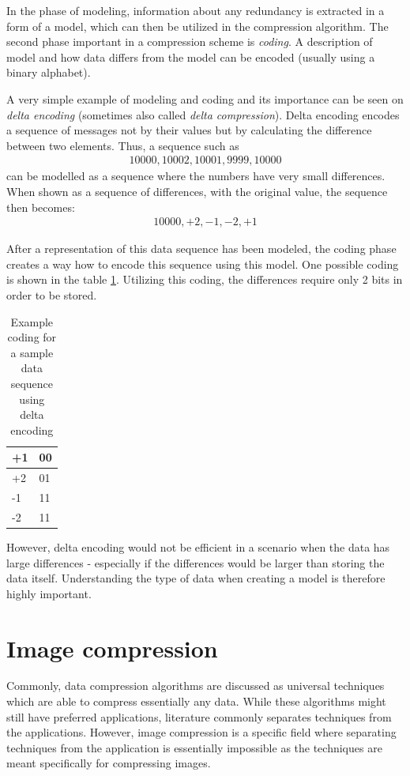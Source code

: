\documentclass[thesis=M,english]{FITthesis}[2012/10/20]
\begin{document}
In the phase of modeling, information about any redundancy is extracted in a form
of a model, which can then be utilized in the compression algorithm. The second phase
important in a compression scheme is \emph{coding}. A description of model and how
data differs from the model can be encoded (usually using a binary alphabet).\cite{datacompression}

A very simple example of modeling and coding and its importance can be seen on \emph{delta
encoding} (sometimes also called \emph{delta compression}). Delta encoding encodes
a sequence of messages not by their values but by calculating the difference
between two elements.\cite{signalprocessing} Thus, a sequence such as
\begin{align*}
  10000, 10002, 10001, 9999, 10000
\end{align*}
can be modelled as a sequence where the numbers have very small differences.
When shown as a sequence of differences, with the original value, the sequence
then becomes:
\begin{align*}
  10000, +2, -1, -2, +1
\end{align*}

After a representation of this data sequence has been modeled, the coding phase
creates a way how to encode this sequence using this model. One possible
coding is shown in the table \ref{tab:deltacoding}. Utilizing this coding, the
differences require only 2 bits in order to be stored.

\begin{table}[]
\centering
\begin{tabular}{|l|l|}
\hline
+1 & 00 \\ \hline
+2 & 01 \\ \hline
-1 & 11 \\ \hline
-2 & 11 \\ \hline
\end{tabular}
\caption{Example coding for a sample data sequence using delta encoding}
\label{tab:deltacoding}
\end{table}

However, delta encoding would not be efficient in a scenario when
the data has large differences - especially if the differences would be larger
than storing the data itself. Understanding the type of data when creating a model
is therefore highly important.


\section{Image compression}
Commonly, data compression algorithms are discussed as universal techniques
which are able to compress essentially any data. While these algorithms might still
have preferred applications, literature commonly separates techniques from the applications.
However, image compression is a specific field where separating techniques from
the application is essentially impossible as the techniques are meant specifically
for compressing images.\cite{datacompression}
\end{document}
